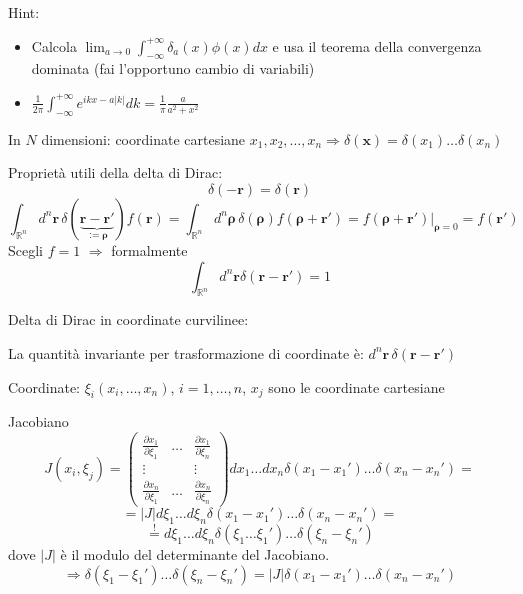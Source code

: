 \documentclass[a4paper,11pt]{report}
\newcommand{\vect}[1]{\boldsymbol{#1}}
\newcommand{\R}{\mathbb{R}}
\newcommand{\x}{\boldsymbol{x}}
\begin{document}
Hint:
\begin{itemize}
\item Calcola $\lim_{a\to 0}\int_{-\infty}^{+\infty}\delta_a(x)\phi(x)dx$ e usa il teorema della convergenza dominata (fai l'opportuno cambio di variabili)
\item $\frac{1}{2\pi}\int^{+\infty}_{-\infty} e^{ikx-a|k|}dk = \frac{1}{\pi}\frac{a}{a^2+x^2}$ 
\end{itemize}

\medskip

In $N$ dimensioni: coordinate cartesiane $x_1,x_2,\dots,x_n \Rightarrow \delta(\x)= \delta(x_1)\dots \delta(x_n)$

\medspace

Propriet\`a utili della delta di Dirac:
\[
\delta(-\boldsymbol{r})=\delta(\boldsymbol{r})
\]
\begin{equation}
\int_{\R^n} d^n\vect{r}\,\delta(\underbrace{\vect{r}-\vect{r}'}_{:=\vect{\rho}})f(\boldsymbol{r}) =
\int_{\R^n}d^n\vect{\rho}\,\delta(\vect{\rho})f(\vect{\rho}+\vect{r}')=
f(\vect{\rho}+\vect{r}')\Big |_{ \vect{\rho}=0}  = f(\vect{r}')
\label{1.7}
\end{equation}
Scegli $f=1$ $\Rightarrow$ formalmente 
\begin{equation}
\int_{\R^n}d^n\vect{r}\delta(\vect{r}-\vect{r}')=1
\end{equation}

\medspace

Delta di Dirac in coordinate curvilinee:

La quantit\`a invariante per trasformazione di coordinate \`e: $d^n\vect{r}\,\delta(\vect{r}-\vect{r}')$

Coordinate: $\xi_i (x_i,\dots,x_n)$, $i=1,\dots,n$, $x_j$ sono le coordinate cartesiane

Jacobiano
\[
J(x_i,\xi_j)=\left(\begin{matrix}
\frac{\partial x_1}{\partial \xi_1} & \dots & \frac{\partial x_1}{\partial \xi_n}\\
\vdots & & \vdots \\
\frac{\partial x_n}{\partial \xi_1} & \dots &\frac{\partial x_n}{\partial \xi_n}
\end{matrix}\right)dx_1\dots dx_n \delta(x_1-x_1')\dots \delta(x_n - x_n')=
\]
\[
=|J|d\xi_1\dots d\xi_n \delta(x_1 - x_1')\dots \delta(x_n-x_n')=
\]
\[
\overset{!}{=}d\xi_1 \dots d\xi_n\delta(\xi_1\dots \xi_1')\dots \delta(\xi_n - \xi_n')
\]
dove $|J|$ \`e il modulo del determinante del Jacobiano.
\begin{equation}
\Rightarrow\delta(\xi_1-\xi_1')\dots\delta(\xi_n-\xi_n')=|J|\delta(x_1-x_1')\dots\delta(x_n-x_n')
\end{equation}
\end{document}
